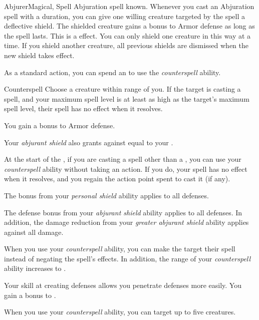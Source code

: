     \begin{feat}{Abjurer}{Magical, Spell}
        \featpre Abjuration spell known.
         Whenever you cast an Abjuration spell with a duration, you can give one willing creature targeted by the spell a deflective shield.
        The shielded creature gains a  bonus to Armor defense as long as the spell lasts.
        This is a   effect.
        You can only shield one creature in this way at a time.
        If you shield another creature, all previous shields are dismissed when the new shield takes effect.

         As a standard action, you can spend an  to use the \textit{counterspell} ability.
        \begin{ability}{Counterspell}
            Choose a creature within \rngmed range of you.
            If the target is casting a spell, and your maximum spell level is at least as high as the target's maximum spell level, their spell has no effect when it resolves.
        \end{ability}

         You gain a  bonus to Armor defense.

         Your \textit{abjurant shield} also grants  against  equal to your .

         At the start of the , if you are casting a spell other than a , you can use your \textit{counterspell} ability without taking an action.
        If you do, your spell has no effect when it resolves, and you regain the action point spent to cast it (if any).

         The bonus from your \textit{personal shield} ability applies to all defenses.

         The defense bonus from your \textit{abjurant shield} ability applies to all defenses.
        In addition, the damage reduction from your \textit{greater abjurant shield} ability applies against all damage.

         When you use your \textit{counterspell} ability, you can make the target  their spell instead of negating the spell's effects.
        In addition, the range of your \textit{counterspell} ability increases to \rnglong.

         Your skill at creating defenses allows you penetrate defenses more easily.
        You gain a  bonus to .

         When you use your \textit{counterspell} ability, you can target up to five creatures.
    \end{feat}

